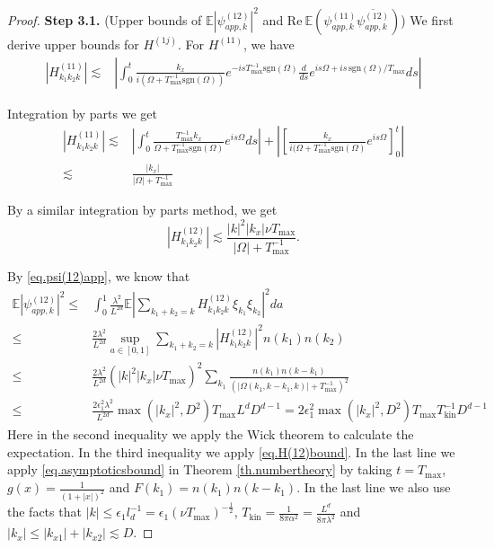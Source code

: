 \begin{proof}
\textbf{Step 3.1.} (Upper bounds of $\mathbb E \left|\psi^{(12)}_{app,k}\right|^2$ and $\text{Re}\ \mathbb E \left(\psi^{(11)}_{app,k}\overline{\psi^{(12)}_{app,k}}\right)$) We first derive upper bounds for $H^{(1j)}$. For $H^{(11)}$, we have
\begin{equation}
\begin{split}
    |H^{(11)}_{k_1k_2k}|\lesssim& \left|\int^{t}_0\frac{k_x}{i(\Omega+T^{-1}_{\text{max}}\text{sgn}(\Omega))}e^{-isT^{-1}_{\text{max}}\text{sgn}(\Omega)}\frac{d}{ds}e^{i s\Omega+is\, \text{sgn}(\Omega)/T_{\text{max}}} ds\right|
\end{split}
\end{equation}

Integration by parts we get 
\begin{equation}\label{eq.H(11)bound}
\begin{split}
    |H^{(11)}_{k_1k_2k}|\lesssim&\left|\int^{t}_0\frac{T_{\text{max}}^{-1}k_x}{\Omega+T^{-1}_{\text{max}}\text{sgn}(\Omega)}e^{i s\Omega} ds\right|+\left|\left[\frac{k_x}{i(\Omega+T^{-1}_{\text{max}}\text{sgn}(\Omega)}e^{i s\Omega}\right]_{0}^t\right|
    \\
    \lesssim& \frac{|k_x|}{|\Omega|+T^{-1}_{\text{max}}}
\end{split}
\end{equation}

By a similar integration by parts method, we get
\begin{equation}\label{eq.H(12)bound}
    |H^{(12)}_{k_1k_2k}|\lesssim \frac{|k|^2|k_x|\nu T_{\text{max}}}{|\Omega|+T^{-1}_{\text{max}}}.
\end{equation}

By \eqref{eq.psi(12)app}, we know that 
\begin{equation}\label{eq.psi(12)bound}
\begin{split}
    \mathbb E \left|\psi^{(12)}_{app,k}\right|^2\le& \int^1_{0}\frac{\lambda^2}{L^{2d}} \mathbb E\left|\sum\limits_{k_1+k_2=k} H^{(12)}_{k_1k_2k}\xi_{k_1} \xi_{k_2}\right|^2 da 
    \\
    \le& \frac{2\lambda^2}{L^{2d}} \sup_{a\in[0,1]}\sum\limits_{k_1+k_2=k} \left|H^{(12)}_{k_1k_2k}\right|^2n(k_1) n(k_2)
    \\
    \le& \frac{2\lambda^2}{L^{2d}} (|k|^2|k_x|\nu T_{\text{max}})^2 \sum\limits_{k_1} \frac{n(k_1) n(k-k_1)}{(|\Omega(k_1,k-k_1,k)|+T^{-1}_{\text{max}})^2}
    \\
    \le& \frac{2\epsilon_1^2\lambda^2}{L^{2d}} \max(|k_x|^2,D^2) T_{\text{max}} L^dD^{d-1}=2\epsilon_1^2 \max(|k_x|^2,D^2) T_{\text{max}} T^{-1}_{\text{kin}}D^{d-1} 
\end{split}   
\end{equation}
Here in the second inequality we apply the Wick theorem to calculate the expectation. In the third inequality we apply \eqref{eq.H(12)bound}. In the last line we apply \eqref{eq.asymptoticsbound} in Theorem \ref{th.numbertheory} by taking $t=T_{\text{max}}$, $g(x)=\frac{1}{(1+|x|)^2}$ and $F(k_1)=n(k_1) n(k-k_1)$. In the last line we also use the facts that $|k|\le \epsilon_1 l_{d}^{-1}=\epsilon_1 (\nu T_{\text{max}})^{-\frac{1}{2}}$, $T_{\text{kin}}=\frac{1}{8\pi\alpha^2}=\frac{L^{d}}{8\pi\lambda^2}$ and $|k_x|\le |k_{x1}|+|k_{x2}|\lesssim D$.


\end{proof}
